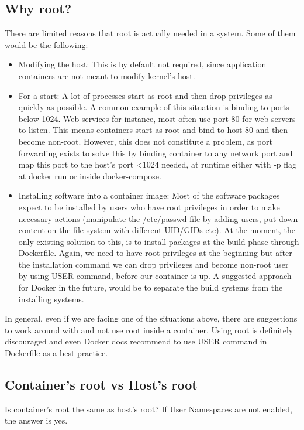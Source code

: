 \subsection{Why root?}
There are limited reasons that root is actually needed in a system. Some of them would be the following:
\begin{itemize}
\item Modifying the host: This is by default not required, since application containers are not meant to modify kernel's host. 

\item For a start: A lot of processes start as root and then drop privileges as quickly as possible. A common example of this situation is binding to ports below 1024. Web services for instance, most often use port 80 for web servers to listen. This means containers start as root and bind to host 80 and then become non-root. However, this does not constitute a problem, as port forwarding exists to solve this by binding container to any network port and map this port to the host's port \textless 1024 needed, at runtime either with -p flag at docker run or inside docker-compose.

\item Installing software into a container image: Most of the software packages expect to be installed by users who have root privileges in order to make necessary actions (manipulate the /etc/passwd file by adding users, put down content on the file system with different UID/GIDs etc). At the moment, the only existing solution to this, is to install packages at the build phase through Dockerfile. Again, we need to have root privileges at the beginning but after the installation command we can drop privileges and become non-root user by using USER command, before our container is up.
A suggested approach for Docker in the future, would be to separate the build systems from the installing systems. 
\end{itemize}

In general, even if we are facing one of the situations above, there are suggestions to work around with and not use root inside a container. Using root is definitely discouraged and even Docker docs recommend to use USER command in Dockerfile as a best practice.\cite{dockerbestpractices} 

\subsection{Container's root vs Host's root}
Is container's root the same as host's root?
If User Namespaces are not enabled, the answer is yes.


